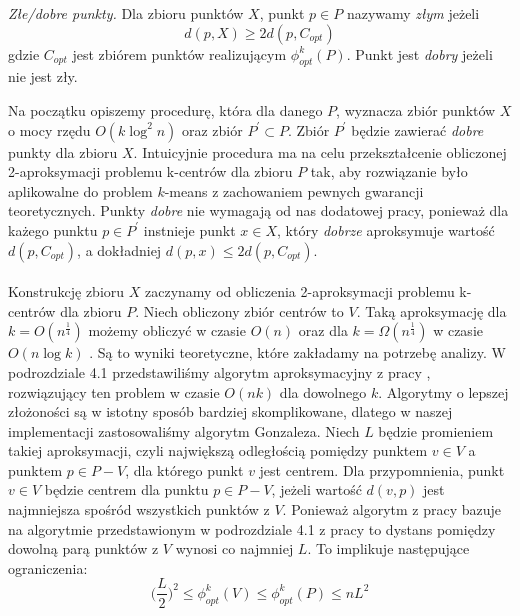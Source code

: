 \begin{definition}
    \emph{Złe/dobre punkty.} Dla zbioru punktów $X$, punkt $p \in P$ nazywamy \textit{złym} jeżeli
    \begin{equation}
        d(p, X) \geq 2d(p, C_{opt})
    \end{equation}
    gdzie $C_{opt}$ jest zbiórem punktów realizującym $\phi_{opt}^{k}(P)$.
    Punkt jest \textit{dobry} jeżeli nie jest zły.
\end{definition}

\noindent
Na początku opiszemy procedurę, która dla danego $P$, wyznacza zbiór punktów $X$ o mocy rzędu $O(k \log^{2}n)$ oraz zbiór $P^{'} \subset P$.
Zbiór $P^{'}$ będzie zawierać \textit{dobre} punkty dla zbioru $X$.
Intuicyjnie procedura ma na celu przekształcenie obliczonej 2-aproksymacji problemu k-centrów dla zbioru $P$ tak, aby rozwiązanie było aplikowalne do problem $k$-means z zachowaniem pewnych gwarancji teoretycznych.
Punkty \textit{dobre} nie wymagają od nas dodatowej pracy, ponieważ dla każego punktu $p \in P^{'}$ instnieje punkt $x \in X$, który \textit{dobrze} aproksymuje wartość $d(p, C_{opt})$, a dokładniej $ d(p, x) \leq 2d(p, C_{opt})$.
\\~\\
Konstrukcję zbioru $X$ zaczynamy od obliczenia 2-aproksymacji problemu k-centrów dla zbioru $P$.
Niech obliczony zbiór centrów to $V$.
Taką aproksymację dla $k = O(n^{\frac{1}{4}})$ możemy obliczyć w czasie $O(n)$ oraz dla $k = \Omega(n^{\frac{1}{4}})$ w czasie $O(n \log k)$ \cite{10.1145/62212.62255}.
Są to wyniki teoretyczne, które zakładamy na potrzebę analizy.
W podrozdziale 4.1 przedstawiliśmy algorytm aproksymacyjny z pracy \cite{Gonzalez1985ClusteringTM}, rozwiązujący ten problem w czasie $O(nk)$ dla dowolnego $k$.
Algorytmy o lepszej złożoności są w istotny sposób bardziej skomplikowane, dlatego w naszej implementacji zastosowaliśmy algorytm Gonzaleza.
Niech $L$ będzie promieniem takiej aproksymacji, czyli największą odległością pomiędzy punktem $v \in V$ a punktem $p \in P-V$, dla którego punkt $v$ jest centrem.
Dla przypomnienia, punkt $v \in V$ będzie centrem dla punktu $p \in P-V$, jeżeli wartość $d(v,p)$ jest najmniejsza spośród wszystkich punktów z $V$.
Ponieważ algorytm z pracy \cite{10.1145/62212.62255} bazuje na algorytmie przedstawionym w podrozdziale 4.1 z pracy \cite{Gonzalez1985ClusteringTM} to dystans pomiędzy dowolną parą punktów z $V$ wynosi co najmniej $L$.
To implikuje następujące ograniczenia:
\begin{equation}
    \Big( \frac{L}{2 } \Big)^2 \leq \phi_{opt}^{k}(V) \leq \phi_{opt}^{k}(P) \leq nL^{2}
\end{equation}
